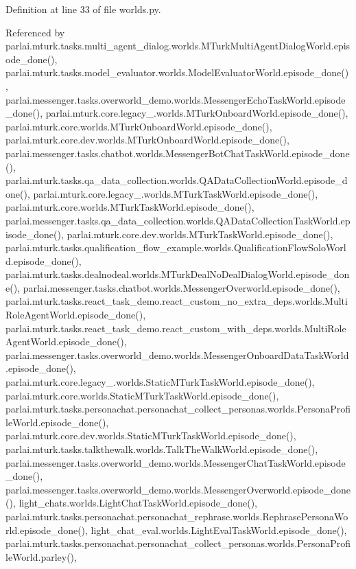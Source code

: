 Definition at line 33 of file worlds.\+py.



Referenced by parlai.\+mturk.\+tasks.\+multi\+\_\+agent\+\_\+dialog.\+worlds.\+M\+Turk\+Multi\+Agent\+Dialog\+World.\+episode\+\_\+done(), parlai.\+mturk.\+tasks.\+model\+\_\+evaluator.\+worlds.\+Model\+Evaluator\+World.\+episode\+\_\+done(), parlai.\+messenger.\+tasks.\+overworld\+\_\+demo.\+worlds.\+Messenger\+Echo\+Task\+World.\+episode\+\_\+done(), parlai.\+mturk.\+core.\+legacy\+\_.\+worlds.\+M\+Turk\+Onboard\+World.\+episode\+\_\+done(), parlai.\+mturk.\+core.\+worlds.\+M\+Turk\+Onboard\+World.\+episode\+\_\+done(), parlai.\+mturk.\+core.\+dev.\+worlds.\+M\+Turk\+Onboard\+World.\+episode\+\_\+done(), parlai.\+messenger.\+tasks.\+chatbot.\+worlds.\+Messenger\+Bot\+Chat\+Task\+World.\+episode\+\_\+done(), parlai.\+mturk.\+tasks.\+qa\+\_\+data\+\_\+collection.\+worlds.\+Q\+A\+Data\+Collection\+World.\+episode\+\_\+done(), parlai.\+mturk.\+core.\+legacy\+\_.\+worlds.\+M\+Turk\+Task\+World.\+episode\+\_\+done(), parlai.\+mturk.\+core.\+worlds.\+M\+Turk\+Task\+World.\+episode\+\_\+done(), parlai.\+messenger.\+tasks.\+qa\+\_\+data\+\_\+collection.\+worlds.\+Q\+A\+Data\+Collection\+Task\+World.\+episode\+\_\+done(), parlai.\+mturk.\+core.\+dev.\+worlds.\+M\+Turk\+Task\+World.\+episode\+\_\+done(), parlai.\+mturk.\+tasks.\+qualification\+\_\+flow\+\_\+example.\+worlds.\+Qualification\+Flow\+Solo\+World.\+episode\+\_\+done(), parlai.\+mturk.\+tasks.\+dealnodeal.\+worlds.\+M\+Turk\+Deal\+No\+Deal\+Dialog\+World.\+episode\+\_\+done(), parlai.\+messenger.\+tasks.\+chatbot.\+worlds.\+Messenger\+Overworld.\+episode\+\_\+done(), parlai.\+mturk.\+tasks.\+react\+\_\+task\+\_\+demo.\+react\+\_\+custom\+\_\+no\+\_\+extra\+\_\+deps.\+worlds.\+Multi\+Role\+Agent\+World.\+episode\+\_\+done(), parlai.\+mturk.\+tasks.\+react\+\_\+task\+\_\+demo.\+react\+\_\+custom\+\_\+with\+\_\+deps.\+worlds.\+Multi\+Role\+Agent\+World.\+episode\+\_\+done(), parlai.\+messenger.\+tasks.\+overworld\+\_\+demo.\+worlds.\+Messenger\+Onboard\+Data\+Task\+World.\+episode\+\_\+done(), parlai.\+mturk.\+core.\+legacy\+\_.\+worlds.\+Static\+M\+Turk\+Task\+World.\+episode\+\_\+done(), parlai.\+mturk.\+core.\+worlds.\+Static\+M\+Turk\+Task\+World.\+episode\+\_\+done(), parlai.\+mturk.\+tasks.\+personachat.\+personachat\+\_\+collect\+\_\+personas.\+worlds.\+Persona\+Profile\+World.\+episode\+\_\+done(), parlai.\+mturk.\+core.\+dev.\+worlds.\+Static\+M\+Turk\+Task\+World.\+episode\+\_\+done(), parlai.\+mturk.\+tasks.\+talkthewalk.\+worlds.\+Talk\+The\+Walk\+World.\+episode\+\_\+done(), parlai.\+messenger.\+tasks.\+overworld\+\_\+demo.\+worlds.\+Messenger\+Chat\+Task\+World.\+episode\+\_\+done(), parlai.\+messenger.\+tasks.\+overworld\+\_\+demo.\+worlds.\+Messenger\+Overworld.\+episode\+\_\+done(), light\+\_\+chats.\+worlds.\+Light\+Chat\+Task\+World.\+episode\+\_\+done(), parlai.\+mturk.\+tasks.\+personachat.\+personachat\+\_\+rephrase.\+worlds.\+Rephrase\+Persona\+World.\+episode\+\_\+done(), light\+\_\+chat\+\_\+eval.\+worlds.\+Light\+Eval\+Task\+World.\+episode\+\_\+done(), parlai.\+mturk.\+tasks.\+personachat.\+personachat\+\_\+collect\+\_\+personas.\+worlds.\+Persona\+Profile\+World.\+parley(), 